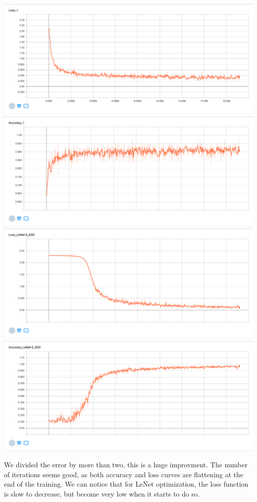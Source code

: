 \documentclass[11pt]{article}
\makeatletter
\def\maxwidth{\ifdim\Gin@nat@width>\linewidth\linewidth
    \else\Gin@nat@width\fi}
\let\Oldincludegraphics\includegraphics
\renewcommand{\includegraphics}[1]{\Oldincludegraphics[width=.8\maxwidth]{#1}}
\makeatother
\begin{document}
    \includegraphics{./MNIST_figures/LossMLP.png}
\includegraphics{./MNIST_figures/AccuracyMLP.png}
\includegraphics{./MNIST_figures/LossSGD.png}
\includegraphics{./MNIST_figures/AccuracySGD.png}

We divided the error by more than two, this is a huge improvment. The
number of iterations seems good, as both accuracy and loss curves are
flattening at the end of the training. We can notice that for LeNet
optimization, the loss function is slow to decrease, but become very low
when it starts to do so.
\end{document}
